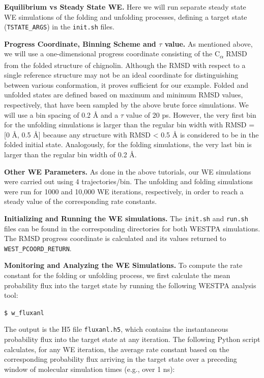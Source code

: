 \documentclass[9pt,tutorial,ASAPversion]{livecoms}
\begin{document}
\textbf{Equilibrium vs Steady State WE.} Here we will run separate steady state WE simulations of the folding and unfolding processes, defining a target state (\verb|TSTATE_ARGS|) in the \verb|init.sh| files.

\textbf{Progress Coordinate, Binning Scheme and $\tau$ value.} As mentioned above, we will use a one-dimensional progress coordinate consisting of the C\textsubscript{$\alpha$} RMSD from the folded structure of chignolin. 
Although the RMSD with respect to a single reference structure may not be an ideal coordinate for distinguishing between  various conformation, it proves sufficient for our example. 
Folded and unfolded states are defined based on maximum and minimum RMSD values, respectively, that have been sampled by the above brute force simulations. 
We will use a bin spacing  of 0.2 \AA{} and a $\tau$ value of 20 ps. 
However, the very first bin for the unfolding simulations is larger than the regular bin width with RMSD = [0 \AA, 0.5 \AA] because any structure with RMSD < 0.5 \AA{} is considered to be in the folded initial state. 
Analogously, for the folding simulations, the very last bin is larger than the regular bin width of 0.2 \AA. 
  
\textbf{Other WE Parameters.} As done in the above tutorials, our WE simulations were carried out using 4 trajectories/bin. 
The unfolding and folding simulations were run for 1000 and 10,000 WE iterations, respectively, in order to reach a steady value of the corresponding rate constants. 
 
\textbf{Initializing and Running the WE simulations.} The \verb|init.sh| and \verb|run.sh| files can be found in the corresponding directories for both WESTPA simulations. 
The RMSD progress coordinate is calculated and its values returned to \verb|WEST_PCOORD_RETURN|.   

\textbf{Monitoring and Analyzing the WE Simulations.} To compute the rate constant for the folding or unfolding process, we first calculate the mean probability flux into the target state by running the following WESTPA analysis tool:
 
\verb|$ w_fluxanl|
 
The output is the H5 file \verb|fluxanl.h5|, which contains the instantaneous probability flux into the target state at any iteration. 
The following Python script calculates, for any WE iteration, the average rate constant based on the corresponding probability flux arriving in the target state over a preceding window of molecular simulation times (e.g., over 1 ns):
 
\end{document}
